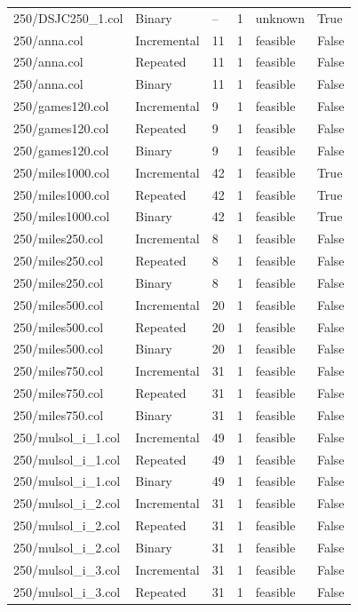 \begin{table}[htbp]
\begin{tabular}{llllll}
250/DSJC250\_1.col & Binary & -- & 1 & unknown & True \\
250/anna.col & Incremental & 11 & 1 & feasible & False \\
250/anna.col & Repeated & 11 & 1 & feasible & False \\
250/anna.col & Binary & 11 & 1 & feasible & False \\
250/games120.col & Incremental & 9 & 1 & feasible & False \\
250/games120.col & Repeated & 9 & 1 & feasible & False \\
250/games120.col & Binary & 9 & 1 & feasible & False \\
250/miles1000.col & Incremental & 42 & 1 & feasible & True \\
250/miles1000.col & Repeated & 42 & 1 & feasible & True \\
250/miles1000.col & Binary & 42 & 1 & feasible & True \\
250/miles250.col & Incremental & 8 & 1 & feasible & False \\
250/miles250.col & Repeated & 8 & 1 & feasible & False \\
250/miles250.col & Binary & 8 & 1 & feasible & False \\
250/miles500.col & Incremental & 20 & 1 & feasible & False \\
250/miles500.col & Repeated & 20 & 1 & feasible & False \\
250/miles500.col & Binary & 20 & 1 & feasible & False \\
250/miles750.col & Incremental & 31 & 1 & feasible & False \\
250/miles750.col & Repeated & 31 & 1 & feasible & False \\
250/miles750.col & Binary & 31 & 1 & feasible & False \\
250/mulsol\_i\_1.col & Incremental & 49 & 1 & feasible & False \\
250/mulsol\_i\_1.col & Repeated & 49 & 1 & feasible & False \\
250/mulsol\_i\_1.col & Binary & 49 & 1 & feasible & False \\
250/mulsol\_i\_2.col & Incremental & 31 & 1 & feasible & False \\
250/mulsol\_i\_2.col & Repeated & 31 & 1 & feasible & False \\
250/mulsol\_i\_2.col & Binary & 31 & 1 & feasible & False \\
250/mulsol\_i\_3.col & Incremental & 31 & 1 & feasible & False \\
250/mulsol\_i\_3.col & Repeated & 31 & 1 & feasible & False \\

\end{tabular}
\end{table}
